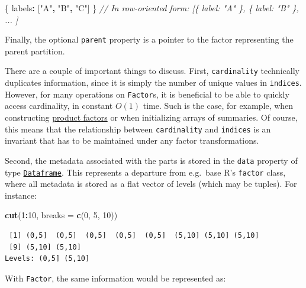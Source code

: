 \documentclass[
  openany]{book}
\newenvironment{Shaded}{\begin{snugshade}}{\end{snugshade}}
\newcommand{\AttributeTok}[1]{\textcolor[rgb]{0.13,0.29,0.53}{#1}}
\newcommand{\CommentTok}[1]{\textcolor[rgb]{0.56,0.35,0.01}{\textit{#1}}}
\newcommand{\DecValTok}[1]{\textcolor[rgb]{0.00,0.00,0.81}{#1}}
\newcommand{\FunctionTok}[1]{\textcolor[rgb]{0.13,0.29,0.53}{\textbf{#1}}}
\newcommand{\NormalTok}[1]{#1}
\newcommand{\OperatorTok}[1]{\textcolor[rgb]{0.81,0.36,0.00}{\textbf{#1}}}
\newcommand{\SpecialCharTok}[1]{\textcolor[rgb]{0.81,0.36,0.00}{\textbf{#1}}}
\newcommand{\StringTok}[1]{\textcolor[rgb]{0.31,0.60,0.02}{#1}}
\theoremstyle{definition}
\theoremstyle{definition}
\theoremstyle{definition}
\theoremstyle{definition}
\theoremstyle{remark}
\begin{document}
\begin{Shaded}
\begin{Highlighting}[]
\NormalTok{\{ labels}\OperatorTok{:}\NormalTok{ [}\StringTok{"A"}\OperatorTok{,} \StringTok{"B"}\OperatorTok{,} \StringTok{"C"}\NormalTok{] \}}
\CommentTok{// In row{-}oriented form: [\{ label: "A" \}, \{ label: "B" \}, ... ]}
\end{Highlighting}
\end{Shaded}

Finally, the optional \texttt{parent} property is a pointer to the factor representing the parent partition.

There are a couple of important things to discuss. First, \texttt{cardinality} technically duplicates information, since it is simply the number of unique values in \texttt{indices}. However, for many operations on \texttt{Factor}s, it is beneficial to be able to quickly access cardinality, in constant \(O(1)\) time. Such is the case, for example, when constructing \hyperref[product-factors]{product factors} or when initializing arrays of summaries. Of course, this means that the relationship between \texttt{cardinality} and \texttt{indices} is an invariant that has to be maintained under any factor transformations.

Second, the metadata associated with the parts is stored in the \texttt{data} property of type \hyperref[dataframe]{\texttt{Dataframe}}. This represents a departure from e.g.~base R's \texttt{factor} class, where all metadata is stored as a flat vector of levels (which may be tuples). For instance:

\begin{Shaded}
\begin{Highlighting}[]
\FunctionTok{cut}\NormalTok{(}\DecValTok{1}\SpecialCharTok{:}\DecValTok{10}\NormalTok{, }\AttributeTok{breaks =} \FunctionTok{c}\NormalTok{(}\DecValTok{0}\NormalTok{, }\DecValTok{5}\NormalTok{, }\DecValTok{10}\NormalTok{))}
\end{Highlighting}
\end{Shaded}

\begin{verbatim}
 [1] (0,5]  (0,5]  (0,5]  (0,5]  (0,5]  (5,10] (5,10] (5,10]
 [9] (5,10] (5,10]
Levels: (0,5] (5,10]
\end{verbatim}

With \texttt{Factor}, the same information would be represented as:
\end{document}
